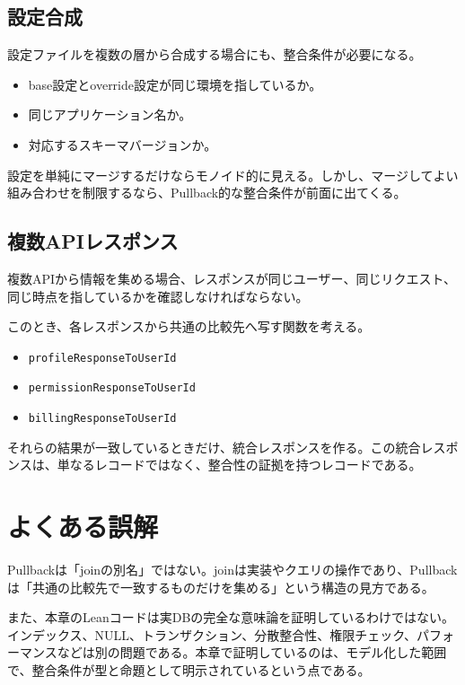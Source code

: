 \subsection{設定合成}

設定ファイルを複数の層から合成する場合にも、整合条件が必要になる。

\begin{itemize}
\item base設定とoverride設定が同じ環境を指しているか。
\item 同じアプリケーション名か。
\item 対応するスキーマバージョンか。
\end{itemize}

設定を単純にマージするだけならモノイド的に見える。しかし、マージしてよい組み合わせを制限するなら、Pullback的な整合条件が前面に出てくる。

\subsection{複数APIレスポンス}

複数APIから情報を集める場合、レスポンスが同じユーザー、同じリクエスト、同じ時点を指しているかを確認しなければならない。

このとき、各レスポンスから共通の比較先へ写す関数を考える。

\begin{itemize}
\item \texttt{profileResponseToUserId}
\item \texttt{permissionResponseToUserId}
\item \texttt{billingResponseToUserId}
\end{itemize}

それらの結果が一致しているときだけ、統合レスポンスを作る。この統合レスポンスは、単なるレコードではなく、整合性の証拠を持つレコードである。

\section{よくある誤解}

\begin{warningbox}
Pullbackは「joinの別名」ではない。joinは実装やクエリの操作であり、Pullbackは「共通の比較先で一致するものだけを集める」という構造の見方である。

また、本章のLeanコードは実DBの完全な意味論を証明しているわけではない。インデックス、NULL、トランザクション、分散整合性、権限チェック、パフォーマンスなどは別の問題である。本章で証明しているのは、モデル化した範囲で、整合条件が型と命題として明示されているという点である。
\end{warningbox}


